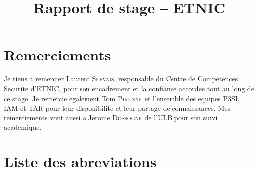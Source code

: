 \documentclass{rapport}
\title{Rapport de stage -- ETNIC}
\begin{document}



\fairemarges
\fairepagedegarde
\tabledematieres

\newpage
\section*{Remerciements}

Je tiens a remercier Laurent \textsc{Servais}, responsable du Centre de
Competences Securite d'ETNIC, pour son encadrement et la confiance accordee
tout au long de ce stage. Je remercie egalement Tom \textsc{Pirenne} et
l'ensemble des equipes P3SI, IAM et TAR pour leur disponibilite et leur
partage de connaissances. Mes remerciements vont aussi a Jerome
\textsc{Dossogne} de l'ULB pour son suivi academique.

\newpage
\section*{Liste des abreviations}
\end{document}
